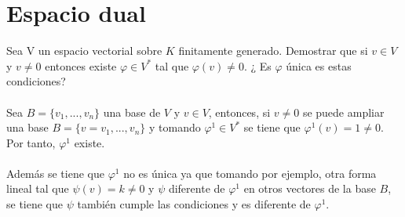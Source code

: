 \section{Espacio dual}
\begin{ejercicio}
	Sea V un espacio vectorial sobre $K$ finitamente generado. Demostrar que si $v \in V$ y $v \neq 0$
	entonces existe $\varphi \in V^{*}$ tal que $\varphi(v) \neq 0$. ¿ Es $\varphi$ única es estas condiciones?
	\\ \\ Sea $B=\{v_1,...,v_n\}$ una base de $V$ y $v \in V$, entonces, si $v \neq 0$ se puede ampliar una base $B=\{v=v_1,...,v_n\}$ y tomando
	$\varphi^1 \in V^{*}$ se tiene que $\varphi^1(v) = 1 \neq 0$. Por tanto, $\varphi^1$ existe. \\ \\
	Además se tiene que $\varphi^1$ no es única ya que tomando por ejemplo, otra forma lineal tal que $\psi(v) = k \neq 0$
	y $\psi$ diferente de $\varphi^1$ en otros vectores de la base $B$, se tiene que $\psi$ también cumple las condiciones y es
	diferente de $\varphi^1$.
\end{ejercicio}

